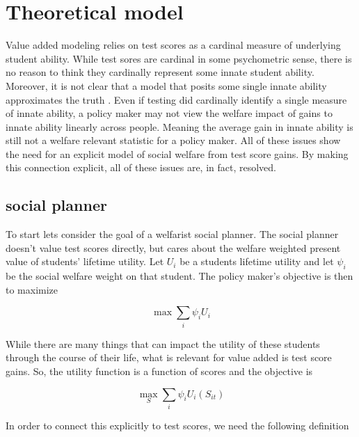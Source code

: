 \documentclass{article}
\theoremstyle{definition}
\theoremstyle{definition}
\theoremstyle{definition}
\begin{document}
\section{Theoretical model}

Value added modeling relies on test scores as a cardinal measure of underlying student ability. While test sores are cardinal in some psychometric sense, there is no reason to think they cardinally represent some innate student ability. Moreover, it is not clear that a model that posits some single innate ability approximates the truth \cite{heckman2022measuring}. Even if testing did cardinally identify a single measure of innate ability, a policy maker may not view the welfare impact of gains to innate ability linearly across people. Meaning the average gain in innate ability is still not a welfare relevant statistic for a policy maker. All of these issues show the need for an explicit model of social welfare from test score gains. By making this connection explicit, all of these issues are, in fact, resolved. 

\subsection{social planner}
To start lets consider the goal of a welfarist social planner. The social planner doesn't value test scores directly, but cares about the welfare weighted present value of students' lifetime utility. Let $U_i$ be a students lifetime utility and let $\psi_i$ be the social welfare weight on that student. The policy maker's objective is then to maximize

\begin{equation}
 \max \sum_i \psi_i U_{i}
\end{equation}

While there are many things that can impact the utility of these students through the course of their life, what is relevant for value added is test score gains. So, the utility function is a function of scores and the objective is

\begin{equation}
 \max_S \sum_i \psi_i U_{i}(S_{it})
\end{equation}

In order to connect this explicitly to test scores, we need the following definition 
\end{document}
